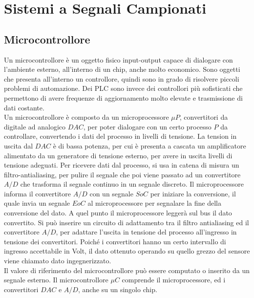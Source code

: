 \documentclass{article}
\numberwithin{equation}{subsection}
\begin{document}
\section{Sistemi a Segnali Campionati}

\subsection{Microcontrollore}

Un microcontrollore è un oggetto fisico input-output capace di dialogare con l'ambiente esterno, all'interno di un chip, anche molto economico. Sono oggetti che presenta 
all'interno un controllore, quindi sono in grado di risolvere piccoli problemi di automazione. Dei PLC sono invece dei controllori più sofisticati che permettono di 
avere frequenze di aggiornamento molto elevate e trasmissione di dati costante. \\

Un microcontrollore è composto da un microprocessore $\mu P$, convertitori da digitale ad analogico $DAC$, per poter dialogare con un certo processo $P$ da controllare, 
convertendo i dati del processo in livelli di tensione. La tension in uscita dal $DAC$ è di bassa potenza, per cui è presenta a cascata un amplificatore alimentato da un 
generatore di tensione esterno, per avere in uscita livelli di tensione adeguati. Per ricevere dati dal processo, si usa in catena di misura un filtro-antialiasing, 
per pulire il segnale che poi viene passato ad un convertitore $A/D$ che trasforma il segnale continuo in un segnale discreto. Il microprocessore informa il convertitore 
$A/D$ con un segnale $SoC$ per iniziare la conversione, il quale invia un segnale $EoC$ al microprocessore per segnalare la fine della conversione del dato. A quel punto 
il microprocessore leggerà sul bus il dato convertito. Si può inserire un circuito di adattamento tra il filtro antialiasing ed il convertitore $A/D$, per adattare 
l'uscita in tensione del processo all'ingresso in tensione dei convertitori. Poiché i convertitori hanno un certo intervallo di ingresso accettabile in Volt, il dato 
ottenuto operando su quello grezzo del sensore viene chiamato dato ingegnerizzato. \\

Il valore di riferimento del microcontrollore può essere computato o inserito da un segnale esterno. Il microcontrollore $\mu C$ comprende il microprocessore, ed i convertitori 
$DAC$ e $A/D$, anche su un singolo chip. 
\end{document}
